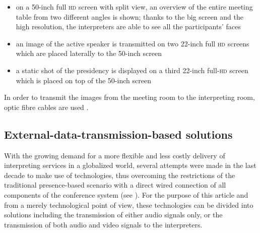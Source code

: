 \documentclass[output=paper]{langsci/langscibook}
\begin{document}
\begin{itemize}
\item on a 50-inch full \textsc{hd} screen with split view, an overview of the entire meeting table from two different angles is shown; thanks to the big screen and the high resolution, the interpreters are able to see all the participants’ faces
\item an image of the active speaker is transmitted on two 22-inch full \textsc{hd} screens which are placed laterally to the 50-inch screen
\item a static shot of the presidency is displayed on a third 22-inch full-\textsc{hd} screen which is placed on top of the 50-inch screen
\end{itemize}

In order to transmit the images from the meeting room to the interpreting room, optic fibre cables are used \citep{Technical2016}. 

\subsection{External-data-transmission-based solutions} 
\label{sub:ziegler:4.2}
With the growing demand for a more flexible and less costly delivery of interpreting services in a globalized world, several attempts were made in the last decade to make use of technologies, thus overcoming the restrictions of the traditional presence-based scenario with a direct wired connection of all components of the conference system (see ). For the purpose of this article and from a merely technological point of view, these technologies can be divided into solutions including the transmission of either audio signals only, or the transmission of both audio and video signals to the interpreters. 
\end{document}
